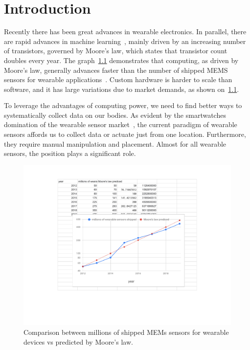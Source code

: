 

\chapter{Introduction}
Recently there has been great advances in wearable electronics. In parallel, there are rapid advances in machine learning~\cite{abadi2016tensorflow,silver2016mastering}, mainly driven by an increasing number of transistors, governed by Moore's law, which states that transistor count doubles every year. The graph~\ref{fig:Moores_law} demonstrates that computing, as driven by Moore's law, generally advances faster than the number of shipped MEMS sensors for wearable applications~\cite{nissila2014ihs}. Custom hardware is harder to scale than software, and it has large variations due to market demands, as shown on~\ref{fig:Moores_law}. 

To leverage the advantages of computing power, we need to find better ways to systematically collect data on our bodies.  As evident by the smartwatches domination of the wearable sensor market~\cite{allAboutWrist}, the current paradigm of wearable sensors affords us to collect data or actuate just from one location. Furthermore, they require manual manipulation and placement. Almost for all wearable sensors, the position plays a significant role. 

\begin{figure}[!ht]
\centering
\includegraphics[width=\textwidth]{pictures/chapter1/Moor_law_graph.pdf}
\caption{Comparison between millions of shipped MEMs sensors for wearable devices vs predicted by Moore's law.}
\label{fig:Moores_law}
\end{figure}

